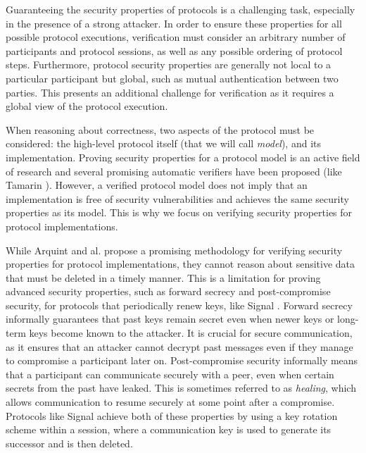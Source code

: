 Guaranteeing the security properties of protocols is a challenging task, especially in the presence of a strong attacker.
In order to ensure these properties for all possible protocol executions, verification must consider an arbitrary number of participants and protocol sessions, as well as any possible ordering of protocol steps. Furthermore, protocol security properties are generally not local to a particular participant but global, such as mutual authentication between two parties. This presents an additional challenge for verification as it requires a global view of the protocol execution.

When reasoning about correctness, two aspects of the protocol must be considered: the high-level protocol itself (that we will call \emph{model}), and its implementation. Proving security properties for a protocol model is an active field of research and several promising automatic verifiers have been proposed (like Tamarin \cite{}). However, a verified protocol model does not imply that an implementation is free of security vulnerabilities and achieves the same security properties as its model. This is why we focus on verifying security properties for protocol implementations.

While Arquint and al.\cite{} propose a promising methodology for verifying security properties for protocol implementations, they cannot reason about sensitive data that must be deleted in a timely manner.
This is a limitation for proving advanced security properties, such as forward secrecy and post-compromise security, for protocols that periodically renew keys, like Signal \cite{}.
Forward secrecy informally guarantees that past keys remain secret even when newer keys or long-term keys become known to the attacker.
It is crucial for secure communication, as it ensures that an attacker cannot decrypt past messages even if they manage to compromise a participant later on.
Post-compromise security informally means that a participant can communicate securely with a peer, even when certain secrets from the past have leaked.
This is sometimes referred to as \emph{healing}, which allows communication to resume securely at some point after a compromise.
Protocols like Signal achieve both of these properties by using a key rotation scheme within a session, where a communication key is used to generate its successor and is then deleted.

